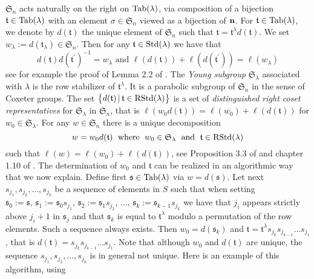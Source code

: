 \documentclass[10pt,a4,twoside,hidelinks,rm]{article}
\newcommand{\s}{\mathfrak{s}}
\newcommand{\T}{\mathfrak{t}}
\newcommand{\Si}{\mathfrak{S}}
\newcommand{\std}{{\rm Std}}
\newcommand{\rstd}{{\rm RStd}}
\newcommand{\Tab}{{\rm Tab}}
\theoremstyle{plain}
\begin{document}
$\Si_n$ acts naturally on the right on $ \Tab(\lambda) $, via
composition of a bijection $ \T \in \Tab(\lambda) $ with an element $ \sigma \in \Si_n $
viewed as a bijection of $ {\bf n}$. 
For $\T \in \Tab(\lambda) $, we denote by
$d(\T)$ the unique element of $\Si_n$ such that
$\T=\T^{\lambda}d(\T)$.
We set $ w_{\lambda}:= d(\T_{\lambda}) \in \Si_n$. Then for any
$ \T \in \std(\lambda) $ 
we have that 
\begin{equation}\label{Murphyduality}
 d(\T) d(\T^{\prime})^{-1} =
w_{\lambda} \mbox{  and }  \ell(d(\T)) + \ell(d(\T^{\prime})) = \ell( w_{\lambda})
\end{equation}  
see for example the proof of Lemma 2.2 of \cite{M92}. 
The \textit{Young subgroup} {$\Si_{\lambda}$} associated with  $\lambda$
is the row stabilizer of $\mathfrak{t}^{\lambda}$.
It is a parabolic subgroup of $ \Si_n $ in the sense of Coxeter groups.
The set 
$  \left\{d(\T) \, | \,  \T  \in \rstd(\lambda) \right\}
$ 
is a set of \textit{distinguished right coset representatives} for $\Si_{\lambda}$ in $ \Si_n$,  that is
$\ell(w_0 d(\T))=\ell(w_0)+\ell(d(\T))$
for $w_0\in\Si_{\lambda}$. 
For any $ w \in \Si_n $ there is a unique decomposition
\begin{equation}\label{decompositionintialkindA}
  w = w_0 d(\T)\; \mbox{ where }\; w_0
  \in \Si_{  \lambda }\;\mbox{ and }\;  \T  \in  \rstd(\lambda)
\end{equation}
such that $\ell(w)=\ell(w_0)+\ell(d(\T))$, 
see Proposition 3.3 of \cite{Mathas} and chapter 1.10 of \cite{Hu}. The determination of
$ w_0 $ and $ \T $ can be realized in 
an algorithmic way that we now explain. 
Define first $ \s \in \Tab(\lambda) $ via $ w = d(\s)$. Let next
$ s_{j_1}, s_{j_2}, \ldots, s_{j_k}$ be a sequence of elements 
in $ S $ such that when setting $ \s_0 := \s, \, \s_1 := \s_0s_{j_1}, \, \s_2 := \s_1 s_{j_2},  \, \ldots, \,
\s_k := \s_{k-1}  s_{j_k} $ we have that $ j_i $ appears strictly above $ j_i+1$ in $ \s_j $ and that
$ \s_k $ is equal to $ \T^{\lambda}$ modulo a permutation of the row elements.
Such a sequence always exists.
Then 
$ w_0 = d(\s_k)$ and $ \T = \T^{\lambda} s_{j_k} s_{j_{k-1}} \dots s_{j_1} $, that is
$ d(\T) = s_{j_k} s_{j_{k-1}} \dots s_{j_1}$. Note that although $ w_0 $ and $ d(\T) $ are unique, the
sequence $ s_{j_1}, s_{j_2}, \ldots, s_{j_k}$ is in general not unique.
Here is an example of this algorithm, using 
\end{document}

